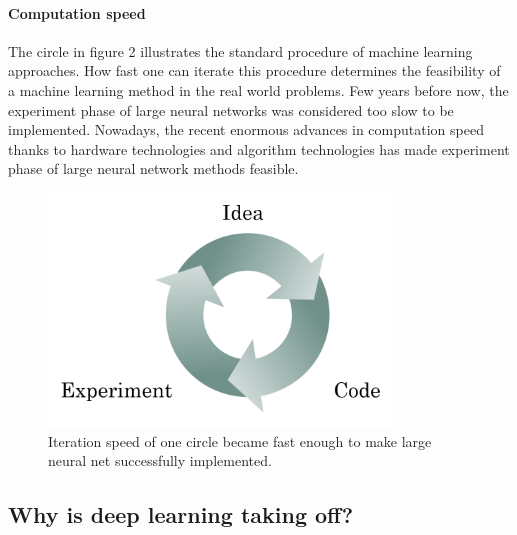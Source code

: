 \paragraph{Computation speed} The circle in figure 2 illustrates the standard procedure of machine learning approaches. How fast one can iterate this procedure determines the feasibility of a machine learning method in the real world problems. Few years before now, the experiment phase of large neural networks was considered too slow to be implemented. Nowadays, the recent enormous advances in computation speed thanks to hardware technologies and algorithm technologies has made experiment phase of large neural network methods feasible.
\begin{figure}[H]
\centering
\includegraphics[height=6.2cm]{c1w1_pic2.png}
\caption{Iteration speed of one circle became fast enough to make large neural net successfully implemented.}
\end{figure}

\newline

\subsection{Why is deep learning taking off?}